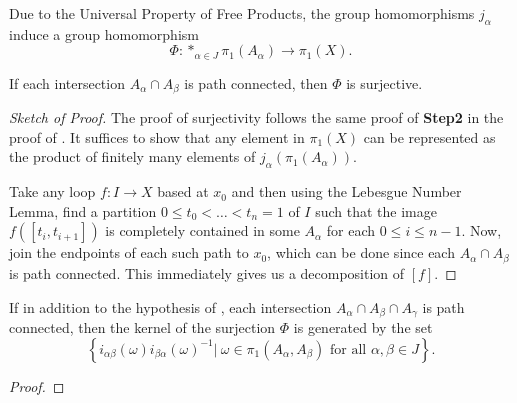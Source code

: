 Due to the Universal Property of Free Products, the group homomorphisms $j_\alpha$ induce a group homomorphism 
\[
    \Phi:\ast_{\alpha\in J}\pi_1(A_\alpha)\to\pi_1(X).
\]

\begin{proposition}
    If each intersection $A_\alpha\cap A_\beta$ is path connected, then $\Phi$ is surjective.
\end{proposition}
\begin{proof}[Sketch of Proof]
    The proof of surjectivity follows the same proof of \textbf{Step2} in the proof of . It suffices to show that any element in $\pi_1(X)$ can be represented as the product of finitely many elements of $j_\alpha\left(\pi_1(A_\alpha)\right)$. 

    Take any loop $f: I\to X$ based at $x_0$ and then using the Lebesgue Number Lemma, find a partition $0\le t_0 < \dots < t_n = 1$ of $I$ such that the image $f([t_i, t_{i + 1}])$ is completely contained in some $A_\alpha$ for each $0\le i\le n - 1$. Now, join the endpoints of each such path to $x_0$, which can be done since each $A_\alpha\cap A_\beta$ is path connected. This immediately gives us a decomposition of $[f]$.
\end{proof}

\begin{proposition}
    If in addition to the hypothesis of , each intersection $A_\alpha\cap A_\beta\cap A_\gamma$ is path connected, then the kernel of the surjection $\Phi$ is generated by the set 
    \begin{equation*}
        \left\{i_{\alpha\beta}(\omega)i_{\beta\alpha}(\omega)^{-1}\big\vert~\omega\in\pi_1(A_\alpha,A_\beta)\text{ for all }\alpha,\beta\in J\right\}.
    \end{equation*}
\end{proposition}
\begin{proof}
\end{proof}